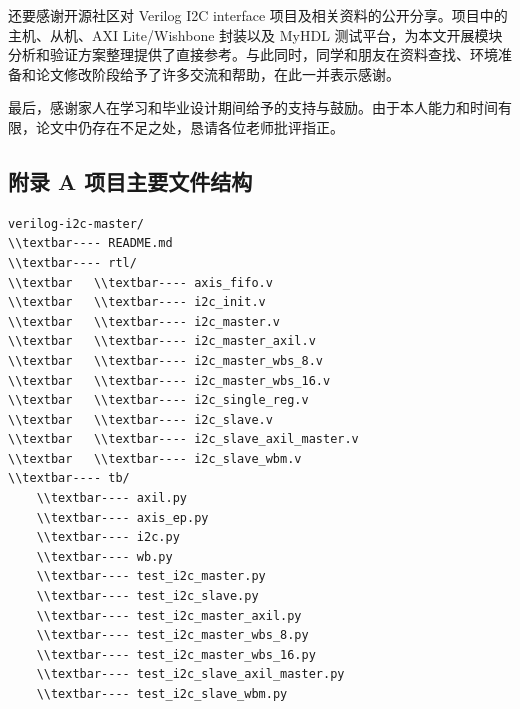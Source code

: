 \documentclass[12pt,a4paper]{article}
\numberwithin{equation}{section}
\begin{document}
还要感谢开源社区对 Verilog I2C interface
项目及相关资料的公开分享。项目中的主机、从机、AXI Lite/Wishbone 封装以及
MyHDL
测试平台，为本文开展模块分析和验证方案整理提供了直接参考。与此同时，同学和朋友在资料查找、环境准备和论文修改阶段给予了许多交流和帮助，在此一并表示感谢。

最后，感谢家人在学习和毕业设计期间给予的支持与鼓励。由于本人能力和时间有限，论文中仍存在不足之处，恳请各位老师批评指正。

\clearpage
\appendix
\subsection{附录 A
项目主要文件结构}\label{ux9644ux5f55-a-ux9879ux76eeux4e3bux8981ux6587ux4ef6ux7ed3ux6784}

\begin{lstlisting}
verilog-i2c-master/
\\textbar---- README.md
\\textbar---- rtl/
\\textbar   \\textbar---- axis_fifo.v
\\textbar   \\textbar---- i2c_init.v
\\textbar   \\textbar---- i2c_master.v
\\textbar   \\textbar---- i2c_master_axil.v
\\textbar   \\textbar---- i2c_master_wbs_8.v
\\textbar   \\textbar---- i2c_master_wbs_16.v
\\textbar   \\textbar---- i2c_single_reg.v
\\textbar   \\textbar---- i2c_slave.v
\\textbar   \\textbar---- i2c_slave_axil_master.v
\\textbar   \\textbar---- i2c_slave_wbm.v
\\textbar---- tb/
    \\textbar---- axil.py
    \\textbar---- axis_ep.py
    \\textbar---- i2c.py
    \\textbar---- wb.py
    \\textbar---- test_i2c_master.py
    \\textbar---- test_i2c_slave.py
    \\textbar---- test_i2c_master_axil.py
    \\textbar---- test_i2c_master_wbs_8.py
    \\textbar---- test_i2c_master_wbs_16.py
    \\textbar---- test_i2c_slave_axil_master.py
    \\textbar---- test_i2c_slave_wbm.py
\end{lstlisting}
\end{document}
